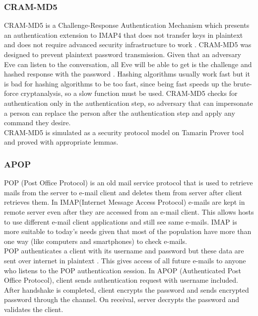 \documentclass[a4paper, 12pt, titlepage]{article}
\begin{document}
\subsubsection{CRAM-MD5}
CRAM-MD5 is a Challenge-Response Authentication Mechanism which presents an authentication extension to IMAP4 that does not transfer keys in plaintext and does not require advanced security infrastructure to work \cite{avcram}. CRAM-MD5 was designed to prevent plaintext password transmission. Given that an adversary Eve can listen to the conversation, all Eve will be able to get is the challenge and hashed response with the password \cite{cramsecure}. Hashing algorithms usually work fast but it is bad for hashing algorithms to be too fast, since being fast speeds up the brute-force cryptanalysis, so a slow function must be used. CRAM-MD5 checks for authentication only in the authentication step, so adversary that can impersonate a person can replace the person after the authentication step and apply any command they desire.
\bigskip
\\ CRAM-MD5 is simulated as a security protocol model on Tamarin Prover tool and proved with appropriate lemmas. 
\subsubsection{APOP}
POP (Post Office Protocol) is an old mail service protocol that is used to retrieve mails from the server to e-mail client and deletes them from server after client retrieves them\cite{apoped}. In IMAP(Internet Message Access Protocol) e-mails are kept in remote server even after they are accessed from an e-mail client. This allows hosts to use different e-mail client applications and still see same e-mails. IMAP is more suitable to today’s needs given that most of the population have more than one way (like computers and smartphones) to check e-mails.
\bigskip
\\POP authenticates a client with its username and password but these data are sent over internet in plaintext \cite{apoptech}. This gives access of all future e-mails to anyone who listens to the POP authentication session. In APOP (Authenticated Post Office Protocol), client sends authentication request with username included. After handshake is completed, client encrypts the password and sends encrypted password through the channel. On receival, server decrypts the password and validates the client.
\end{document}
